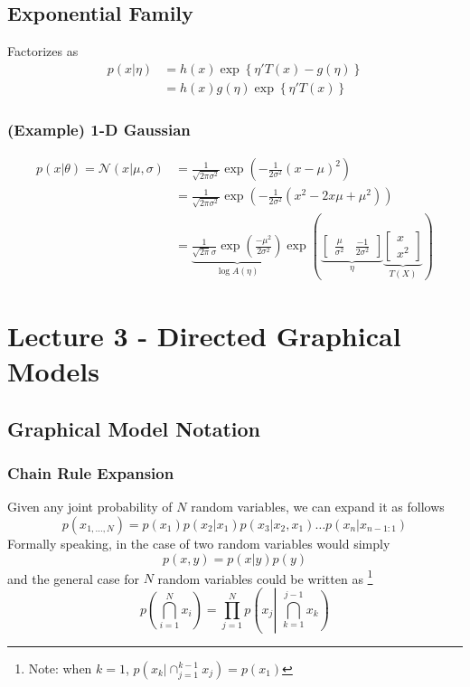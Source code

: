 \documentclass[11pt]{article}
\begin{document}
\subsection{Exponential Family}
Factorizes as
\begin{align*}
    p(x | \eta) 
    &=h(x) \exp \left\{\eta' T(x)-g(\eta)\right\} \\
    &=h(x) g(\eta) \exp \left\{\eta' T(x)\right\}
\end{align*}
\subsubsection{(Example) 1-D Gaussian}
\begin{align*}
    p(x|\theta) = \mathcal{N}(x|\mu, \sigma)
    &= \frac{1}{\sqrt{2\pi \sigma^2}}\exp \left(- \frac{1}{2\sigma^2} (x - \mu)^2 \right) \\
    &= \frac{1}{\sqrt{2\pi \sigma^2}}\exp \left(- \frac{1}{2\sigma^2} (x^2 - 2x\mu + \mu^2) \right) \\
    &= \underbrace{
        \frac{1}{\sqrt{2\pi}\sigma} \exp\left( \frac{-\mu^2}{2\sigma^2} \right)}_{\log A(\eta)}
    \exp\left(
    \underbrace{
        \begin{bmatrix}
            \frac{\mu}{\sigma^2} 
            & \frac{-1}{2\sigma^2}
        \end{bmatrix}}_{\eta}
    \underbrace{
        \begin{bmatrix}
            x \\
            x^2
        \end{bmatrix}}_{T(X)}
    \right)
\end{align*}



\section{Lecture 3 - Directed Graphical Models}
\subsection{Graphical Model Notation}
\subsubsection{Chain Rule Expansion} Given any joint probability of $N$ random variables, we can expand it as follows
\begin{equation*}
    p\left(x_{1, \ldots, N}\right)=p\left(x_{1}\right) p\left(x_{2} | x_{1}\right) p\left(x_{3} | x_{2}, x_{1}\right) \ldots p\left(x_{n} | x_{n-1: 1}\right)
\end{equation*}
Formally speaking, in the case of two random variables would simply
\begin{equation*}
    p(x, y)=p(x | y) p(y)
\end{equation*}
and the general case for $N$ random variables could be written as
\footnote{Note: when $k = 1$, $p\left(x_{k} | \cap_{j=1}^{k-1} x_{j}\right) = p(x_1)$}
\begin{equation*}
    p\left(\bigcap_{i=1}^{N} x_{i}\right)
    = \prod_{j=1}^{N} p\left(x_{j} \left\vert\,\, \bigcap_{k=1}^{j-1} x_{k}\right)\right.
\end{equation*}
\end{document}
